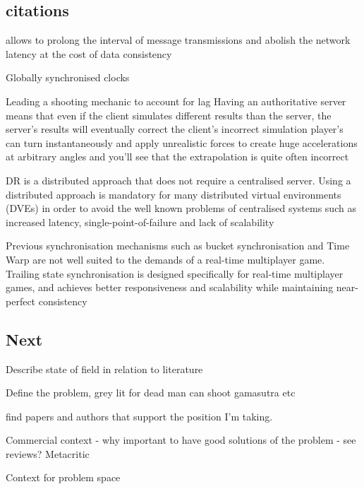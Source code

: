 \documentclass[journal]{IEEEtran}
\begin{document}
\subsection{citations}

allows to prolong the interval of message transmissions and abolish the network latency at the cost of data consistency \cite{smed2002aspects}



Globally synchronised clocks \cite{aggarwal2004accuracy}

Leading a shooting mechanic to account for lag \cite{bernier2001latency}
Having an authoritative server means that even if the client simulates different results than the server, the server’s results will eventually correct the client’s incorrect simulation \cite{bernier2001latency}
player’s can turn instantaneously and apply unrealistic forces to create huge accelerations at arbitrary angles and you’ll see that the extrapolation is quite often incorrect \cite{bernier2001latency}

DR is a distributed approach that does not require a centralised server. Using a distributed approach is mandatory for many distributed virtual environments (DVEs) in order to avoid the well known problems of centralised systems such as increased latency, single-point-of-failure and lack of scalability \cite{mauve2000keep}

Previous synchronisation mechanisms such as bucket synchronisation and Time Warp are not well suited to the demands of a real-time multiplayer game. Trailing state synchronisation is designed specifically for real-time multiplayer games, and achieves better responsiveness and scalability while maintaining near-perfect consistency \cite{cronin2001distributed}


\subsection{Next}

Describe state of field in relation to literature

Define the problem, grey lit for dead man can shoot gamasutra etc

find papers and authors that support the position I'm taking.

Commercial context - why important to have good solutions of the problem - see reviews? Metacritic

Context for problem space
\end{document}
